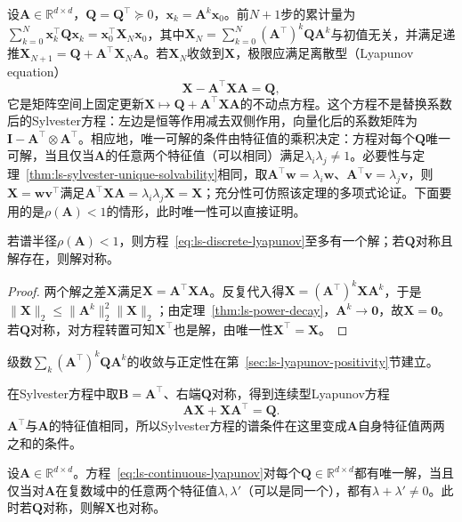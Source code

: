 设$\bm A\in\mathbb R^{d\times d}$，$\bm Q=\bm Q^\top\succeq0$，$\bm x_k=\bm A^k\bm x_0$。前$N+1$步的累计量为$\sum_{k=0}^{N}\bm x_k^\top\bm Q\bm x_k=\bm x_0^\top\bm X_N\bm x_0$，其中$\bm X_N=\sum_{k=0}^{N}(\bm A^\top)^k\bm Q\bm A^k$与初值无关，并满足递推$\bm X_{N+1}=\bm Q+\bm A^\top\bm X_N\bm A$。若$\bm X_N$收敛到$\bm X$，极限应满足离散型（Lyapunov equation）
\begin{equation}
 \bm X-\bm A^\top\bm X\bm A=\bm Q ,
 \label{eq:ls-discrete-lyapunov}
\end{equation}
它是矩阵空间上固定更新$\bm X\mapsto\bm Q+\bm A^\top\bm X\bm A$的不动点方程。这个方程不是替换系数后的Sylvester方程：左边是恒等作用减去双侧作用，向量化后的系数矩阵为$\bm I-\bm A^\top\otimes\bm A^\top$。相应地，唯一可解的条件由特征值的乘积决定：方程对每个$\bm Q$唯一可解，当且仅当$\bm A$的任意两个特征值（可以相同）满足$\lambda_i\lambda_j\neq1$。必要性与定理~\ref{thm:ls-sylvester-unique-solvability}相同，取$\bm A^\top\bm w=\lambda_i\bm w$、$\bm A^\top\bm v=\lambda_j\bm v$，则$\bm X=\bm w\bm v^\top$满足$\bm A^\top\bm X\bm A=\lambda_i\lambda_j\bm X=\bm X$；充分性可仿照该定理的多项式论证。下面要用的是$\rho(\bm A)<1$的情形，此时唯一性可以直接证明。

\begin{lemma}[谱半径小于一时的唯一性]
\label{lem:ls-discrete-lyapunov-uniqueness}
若谱半径$\rho(\bm A)<1$，则方程~\eqref{eq:ls-discrete-lyapunov}至多有一个解；若$\bm Q$对称且解存在，则解对称。
\end{lemma}

\begin{proof}
两个解之差$\bm X$满足$\bm X=\bm A^\top\bm X\bm A$。反复代入得$\bm X=(\bm A^\top)^k\bm X\bm A^k$，于是$\lVert\bm X\rVert_2\leq\lVert\bm A^k\rVert_2^2\lVert\bm X\rVert_2$；由定理~\ref{thm:ls-power-decay}，$\bm A^k\to\bm0$，故$\bm X=\bm0$。若$\bm Q$对称，对方程转置可知$\bm X^\top$也是解，由唯一性$\bm X^\top=\bm X$。
\end{proof}

级数$\sum_k(\bm A^\top)^k\bm Q\bm A^k$的收敛与正定性在第~\ref{sec:ls-lyapunov-positivity}节建立。

在Sylvester方程中取$\bm B=\bm A^\top$、右端$\bm Q$对称，得到连续型Lyapunov方程
\begin{equation}
 \bm A\bm X+\bm X\bm A^\top=\bm Q .
 \label{eq:ls-continuous-lyapunov}
\end{equation}
$\bm A^\top$与$\bm A$的特征值相同，所以Sylvester方程的谱条件在这里变成$\bm A$自身特征值两两之和的条件。

\begin{theorem}[连续型Lyapunov方程的唯一可解性]
\label{thm:ls-continuous-lyapunov-unique}
设$\bm A\in\mathbb R^{d\times d}$。方程~\eqref{eq:ls-continuous-lyapunov}对每个$\bm Q\in\mathbb R^{d\times d}$都有唯一解，当且仅当对$\bm A$在复数域中的任意两个特征值$\lambda,\lambda'$（可以是同一个），都有$\lambda+\lambda'\neq0$。此时若$\bm Q$对称，则解$\bm X$也对称。
\end{theorem}

